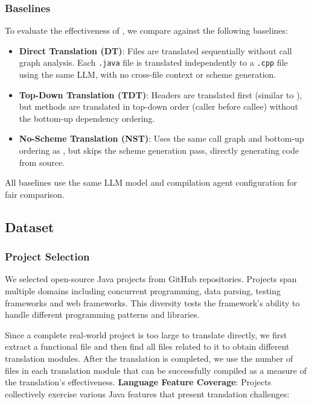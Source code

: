\subsubsection{Baselines}

To evaluate the effectiveness of \tool{}, we compare against the following baselines:

\begin{itemize}
\item \textbf{Direct Translation (DT)}: Files are translated sequentially without call graph analysis. Each \texttt{.java} file is translated independently to a \texttt{.cpp} file using the same LLM, with no cross-file context or scheme generation.

\item \textbf{Top-Down Translation (TDT)}: Headers are translated first (similar to \tool{}), but methods are translated in top-down order (caller before callee) without the bottom-up dependency ordering.

\item \textbf{No-Scheme Translation (NST)}: Uses the same call graph and bottom-up ordering as \tool{}, but skips the scheme generation pass, directly generating code from source.
\end{itemize}

All baselines use the same LLM model and compilation agent configuration for fair comparison.

\subsection{Dataset}

\subsubsection{Project Selection}

We selected  open-source Java projects from GitHub repositories. Projects span multiple domains including concurrent programming, data parsing, testing frameworks and web frameworks. This diversity tests the framework's ability to handle different programming patterns and libraries.

Since a complete real-world project is too large to translate directly, we first extract a functional file and then find all files related to it to obtain different translation modules. After the translation is completed, we use the number of files in each translation module that can be successfully compiled as a measure of the translation's effectiveness.
\textbf{Language Feature Coverage}: Projects collectively exercise various Java features that present translation challenges:

